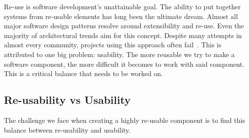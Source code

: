 Re-use is software development’s unattainable goal. The ability to put together systems from re-usable elements has long been the ultimate dream. Almost all major software design patterns resolve around extensibility and re-use. Even the majority of architectural trends aim for this concept. Despite many attempts in almost every community, projects using this approach often fail~\cite{reusedreamdead}.
This is attributed to one big problem: usability. The more reusable we try to make a software component, the more difficult it becomes to work with said component. This is a critical balance that needs to be worked on.

\subsection{Re-usability vs Usability}
%

The challenge we face when creating a highly re-usable component is to find this balance between re-usability and usability.

